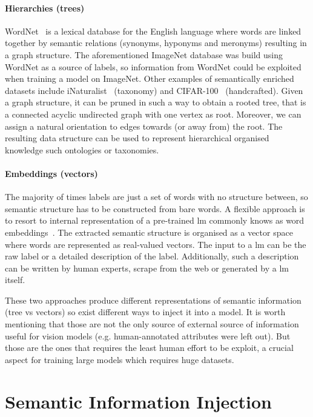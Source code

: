 \paragraph{Hierarchies (trees)}
\label{par:hierarchies-tree}
WordNet~\cite{WordnetMi1995} is a lexical database for the English language
where words are linked together by semantic relations (synonyms, hyponyms and
meronyms) resulting in a graph structure. The aforementioned ImageNet database
was build using WordNet as a source of labels, so information from WordNet could
be exploited when training a model on ImageNet. Other examples of semantically
enriched datasets include iNaturalist~\cite{TheInaturalistHorn2017} (taxonomy)
and CIFAR-100~\cite{LearningMultipKrizhe2009} (handcrafted). Given a graph
structure, it can be pruned in such a way to obtain a rooted tree, that is a
connected acyclic undirected graph with one vertex as root. Moreover, we can
assign a natural orientation to edges towards (or away from) the root. The
resulting data structure can be used to represent hierarchical organised
knowledge such ontologies or taxonomies.

\paragraph{Embeddings (vectors)}
\label{par:embeddings-vectors}
The majority of times labels are just a set of words with no structure between,
so semantic structure has to be constructed from bare words. A flexible
approach is to resort to internal representation of a pre-trained \acrfull{lm}
commonly knows as word embeddings~\cite{BeyondWordEmbIncitt2023}. The extracted
semantic structure is organised as a vector space where words are represented
as real-valued vectors. The input to a \acrshort{lm} can be the raw label or a
detailed description of the label. Additionally, such a description can be
written by human experts, scrape from the web or generated by a \acrshort{lm}
itself.\medskip

These two approaches produce different representations of semantic information
(tree vs vectors) so exist different ways to inject it into a model. It is
worth mentioning that those are not the only source of external source of
information useful for vision models (e.g. human-annotated attributes were left
out). But those are the ones that requires the least human effort to be
exploit, a crucial aspect for training large models which requires huge
datasets.

\section{Semantic Information Injection}
\label{sec:semantic-information-injection}

